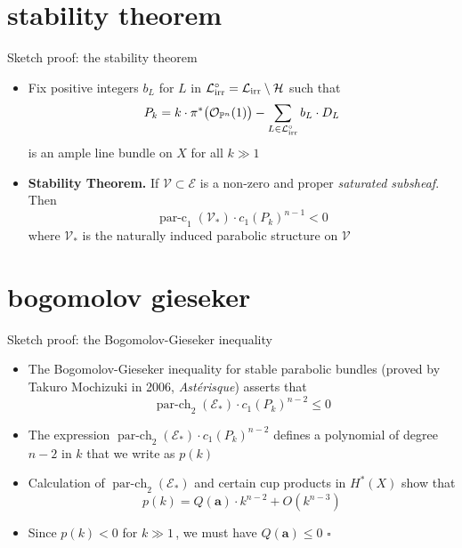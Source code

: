 \documentclass{beamer}
\renewcommand{\P}{\mathbb{P}}
\newcommand{\mE}{\mathcal{E}}
\newcommand{\mO}{\mathcal{O}}
\newcommand{\mH}{\mathcal{H}}
\newcommand{\mV}{\mathcal{V}}
\newcommand{\ba}{\mathbf{a}}
\newcommand{\mLi}{\mathcal{L}_{\textup{irr}}}
\DeclareMathOperator{\parch}{par-ch}
\DeclareMathOperator{\parc}{par-c}
\begin{document}
\section{stability theorem}
\begin{frame}{Sketch proof: the stability theorem}
	\begin{itemize}
		\item Fix positive integers \(b_L\) for \(L\) in \( \mLi^{\circ} = \mLi \setminus \mH\) such  that
		\begin{equation*}
		P_k = k \cdot \pi^*\big(\mO_{\P^n}(1)\big) - \sum_{L \in \mLi^{\circ}} b_L \cdot D_L
		\end{equation*}
		is an ample line bundle on \(X\) for all \(k \gg 1\)
		
		\item \textbf{Stability Theorem.}
		If \(\mV \subset \mE\) is a non-zero and proper \emph{saturated subsheaf}. Then
		\[
		\parc_{1}(\mV_{*}) \cdot c_1(P_k)^{n-1} < 0 
		\]
		where \(\mV_{*}\) is the naturally induced parabolic structure on \(\mV\)
	\end{itemize}
\end{frame}

\section{bogomolov gieseker}
\begin{frame}{Sketch proof: the Bogomolov-Gieseker inequality}
	\begin{itemize}
		\item The Bogomolov-Gieseker inequality for stable parabolic bundles (proved by Takuro Mochizuki in 2006, \emph{Ast\'erisque}) asserts that
		\[
	   \parch_2(\mE_{*}) \cdot 	c_1(P_k)^{n-2}  \leq 0 
		\]
		\item The expression \(\parch_2(\mE_{*}) \cdot 	c_1(P_k)^{n-2}\) defines a polynomial of degree \(n-2\) in \(k\) that we write as \(p(k)\)
		\item Calculation of \(\parch_2(\mE_{*})\) and certain cup products in \(H^*(X)\) show that
		\[
		p(k) = Q(\ba) \cdot k^{n-2} + O(k^{n-3}) 
		\]
		\item Since \(p(k)<0\) for \(k \gg 1\)\,, we must have \(Q(\ba) \leq 0\)  \(\square\)
	\end{itemize}
\end{frame}
\end{document}

